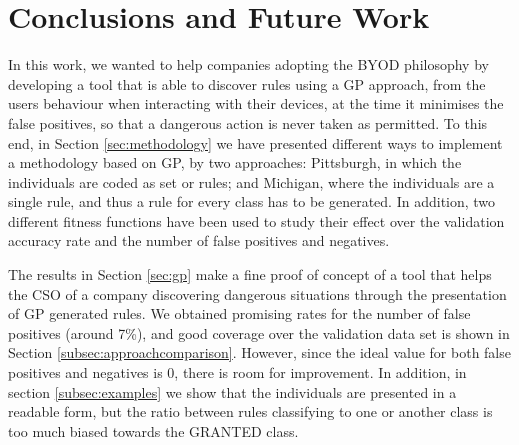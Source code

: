 \section{Conclusions and Future Work}
\label{sec:future}


In this work, we wanted to help companies adopting the BYOD philosophy
by developing a tool that is able to discover rules using a GP
approach, from the users behaviour when interacting with their
devices, at the time it minimises the false positives, so that a
dangerous action is never taken as permitted. To this end, in Section \ref{sec:methodology} we have
presented different ways to implement a methodology based on GP, by two
approaches: Pittsburgh, in which the individuals are coded as set or
rules; and Michigan, where the individuals are a single rule, and thus
a rule for every class has to be generated. In addition, two different
fitness functions have been used to study their effect over the
validation accuracy rate and the number of false positives and
negatives.

The results in Section \ref{sec:gp} make a fine proof of concept of a tool that helps the CSO of a company discovering dangerous situations through the presentation of GP generated rules. We obtained promising rates for the number of false positives (around
7\%), and good coverage over the validation data set is shown in Section \ref{subsec:approachcomparison}. However, since the ideal value for both false positives and negatives is 0, there is room for improvement. In addition, in section \ref{subsec:examples} we show that the individuals are presented in a readable form, but the ratio between rules classifying to one or another class is too much biased towards the GRANTED class. 

